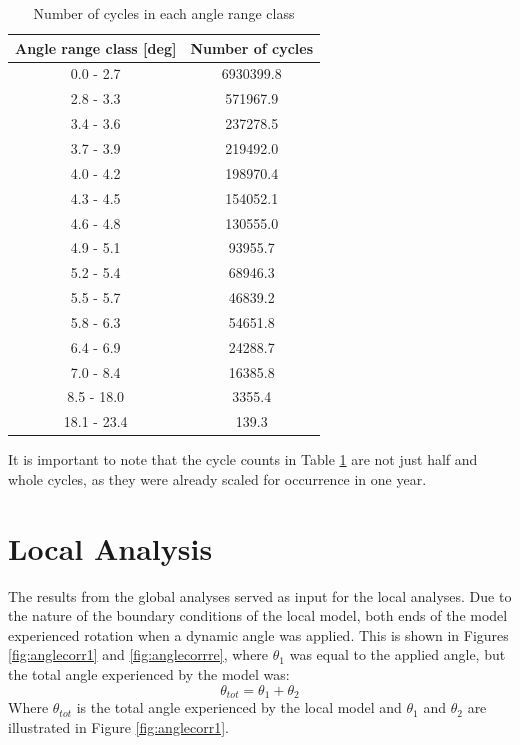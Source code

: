 \begin{table} [H]
\centering
\begin{tabular}{ |c|c|}
\hline
Angle range class [deg] & Number of cycles \\
 \hline
 \hline
0.0 - 2.7 & 6930399.8\\

2.8 - 3.3 & 571967.9\\
 
3.4 - 3.6 & 237278.5 \\
 
3.7 - 3.9& 219492.0  \\

4.0 - 4.2& 198970.4  \\

4.3  - 4.5 & 154052.1  \\

4.6 - 4.8 & 130555.0 \\

4.9 - 5.1 & 93955.7 \\

5.2 - 5.4 & 68946.3 \\

5.5 - 5.7 & 46839.2 \\

5.8 - 6.3 & 54651.8 \\

6.4 - 6.9 & 24288.7 \\

7.0 - 8.4 & 16385.8 \\

8.5 - 18.0 & 3355.4 \\

18.1 - 23.4 & 139.3  \\

 \hline
\end{tabular}
\caption{Number of cycles in each angle range class}
\label{table:angleclass}
\end{table} 
It is important to note that the cycle counts in Table \ref{table:angleclass} are not just half and whole cycles, as they were already scaled for occurrence in one year.

\section{Local Analysis}
The results from the global analyses served as input for the local analyses. Due to the nature of the boundary conditions of the local model, both ends of the model experienced rotation when a dynamic angle was applied. This is shown in Figures \ref{fig:anglecorr1} and \ref{fig:anglecorrre}, where $\theta_1$ was equal to the applied angle, but the total angle experienced by the model was: 
\begin{equation}
    \theta_{tot}=\theta_1 + \theta_2
\end{equation}
Where $\theta_{tot}$ is the total angle experienced by the local model and $\theta_1$ and $\theta_2$ are illustrated in Figure \ref{fig:anglecorr1}.

